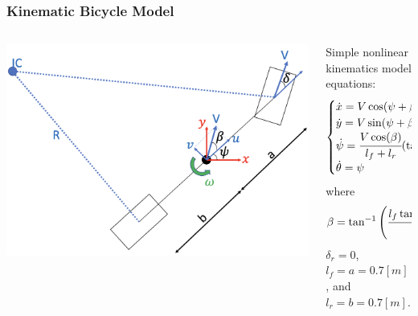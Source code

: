 \documentclass[aspectratio=169]{beamer}
\begin{document}
\begin{frame}
	\frametitle{Kinematic Bicycle Model \cite{Rajamani2012}}

	\begin{columns}
		\begin{column}{0.4\textwidth}
			\includegraphics[width=\columnwidth]{figs/BicycleModel.png}
		\end{column}
		\begin{column}{0.5\textwidth}
			Simple nonlinear kinematics model equations:
			\begin{equation}
				\begin{cases}
					\dot{x} = V \cos(\psi + \beta)\\
					\dot{y} = V \sin(\psi + \beta)\\
					\dot{\psi} = \cfrac{V \cos(\beta)}{l_f + l_r} \qty(\tan(\delta_f) - \tan(\delta_r))\\
					\dot{\theta} = \psi
				\end{cases}
			\end{equation}
			where
			\begin{equation}
				\beta = \tan^{-1}\qty(\cfrac{l_f \tan(\delta_r) + l_r \tan(\delta_f)}{l_f + l_r})
			\end{equation}
			$\delta_r = 0$, $l_f = a = 0.7 [m]$, and $l_r = b = 0.7 [m]$.
		\end{column}
	\end{columns}

\end{frame}
\end{document}
